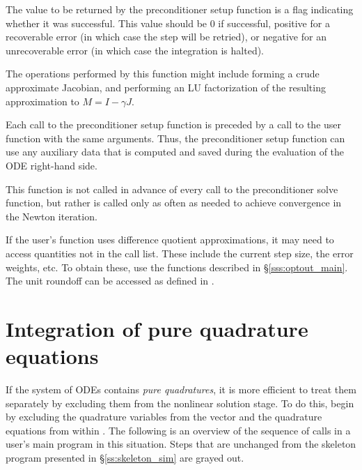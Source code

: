 {
  The value to be returned by the preconditioner setup function is a flag
  indicating whether it was successful.  This value should be $0$ if successful, 
  positive for a recoverable error (in which case the step will be retried), or
  negative for an unrecoverable error (in which case the integration is halted). 
}
{
  The operations performed by this function might include forming a crude 
  approximate Jacobian, and performing an LU factorization of the resulting
  approximation to $M=I - \gamma J$.

  Each call to the preconditioner setup function is preceded by a call to     
  the  user function with the same  arguments.  
  Thus, the preconditioner setup function can use any auxiliary data that is 
  computed and saved during the evaluation of the ODE right-hand side.
  
  This function is not called in advance of every call to the preconditioner
  solve function, but rather is called only as often as needed to achieve
  convergence in the Newton iteration. 

  If the user's  function uses difference quotient
  approximations, it may need to access quantities not in the call
  list. These include the current step size, the error weights, etc.
  To obtain these, use the  functions described in
  \S\ref{sss:optout_main}. The unit roundoff can be accessed
  as  defined in .
}

\section{Integration of pure quadrature equations}

If the system of ODEs contains {\em pure quadratures}, it is more efficient
to treat them separately by excluding them from the nonlinear solution stage. 
To do this, begin by excluding the quadrature variables from the vector 
and the quadrature equations from within . The following is an overview of 
the sequence of calls in a user's main program in this situation. Steps that are
unchanged from the skeleton program presented in \S\ref{ss:skeleton_sim} are 
grayed out.

